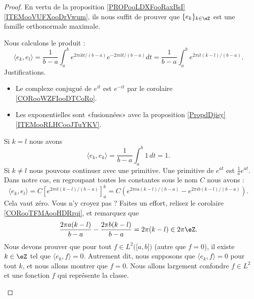 \begin{proof}
	En vertu de la proposition \ref{PROPooLDXFooRaxBsI}\ref{ITEMooVUFXooDrVwum}, ils nous suffit de prouver que \( \{ e_k \}_{k\in \eZ}\) est une famille orthonormale maximale.

	\begin{subproof}
		\spitem[Orthonormale]
		Nous calculons le produit :
		\begin{equation}
			\langle e_k, e_l\rangle =\frac{1}{ b-a }\int_a^b e^{2\pi i kt/(b-a)} e^{-2\pi i lt/(b-a)}dt
			=\frac{1}{ b-a }\int_a^b e^{2\pi i t(k-l)/(b-a)}.
		\end{equation}
		Justifications.
		\begin{itemize}
			\item
			      Le complexe conjugué de \(  e^{it}\) est \(  e^{-it}\) par le corolaire \ref{CORooWZFIooDTCoRo}.
			\item
			      Les exponentielles sont «fusionnées» avec la proposition \ref{PropdDjisy}\ref{ITEMooRLHCooJTuYKV}.
		\end{itemize}
		Si \( k=l\) nous avons
		\begin{equation}
			\langle e_k, e_k\rangle =\frac{1}{ b-a }\int_a^b1\,dt=1.
		\end{equation}
		Si \( k\neq l\) nous pouvons continuer avec une primitive. Une primitive de \(  e^{at}\) est \( \frac{1}{ a } e^{at}\). Dans notre cas, en regroupant toutes les constantes sous le nom \( C\) nous avons :
		\begin{equation}
			\langle e_k, e_l\rangle =C\left[   e^{2\pi it(k-l)/(b-a)} \right]_a^b=C\left(  e^{2\pi i a(k-l)/(b-a)}- e^{2\pi i b(k-l)/(b-a)} \right).
		\end{equation}
		Cela vaut zéro. Vous n'y croyez pas ? Faites un effort, relisez le corolaire \ref{CORooTFMAooHDRrqi}, et remarquez que
		\begin{equation}
			\frac{ 2\pi a(k-l) }{ b-a }-\frac{ 2\pi b(k-l) }{ b-a }=2\pi (k-l)\in 2\pi \eZ.
		\end{equation}
		\spitem[Maximale]
		Nous devons prouver que pour tout \( f\in L^2\big( \mathopen[ a , b \mathclose] \big)\) (autre que \( f=0\)), il existe \( k\in \eZ\) tel que \( \langle e_k, f\rangle =0\). Autrement dit, nous supposons que \( \langle e_k, f\rangle =0\) pour tout \( k\), et nous allons montrer que \( f=0\). Nous allons largement confondre \( f\in L^2\) et une fonction \( f\) qui représente la classe.
	\end{subproof}
\end{proof}

